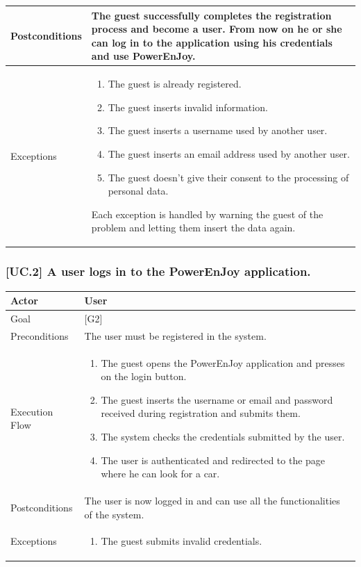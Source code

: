 \documentclass[english]{article}
\begin{document}
	\begin{tabularx}{\textwidth}{  l  X  }
		\hline
		Postconditions & The guest successfully completes the registration process and become a user. From now on he or she can log in to the application using his credentials and use PowerEnJoy.\\
		\hline
		Exceptions & \begin{enumerate}
			\item{The guest is already registered.}
			\item{The guest inserts invalid information.}
			\item{The guest inserts a username used by another user.}
			\item{The guest inserts an email address used by another user.}
			\item{The guest doesn't give their consent to the processing of personal data.}
		\end{enumerate}
		Each exception is handled by warning the guest of the problem and letting them insert the data again.\\
		\hline
	\end{tabularx}

	\subsubsection{[UC.2] A user logs in to the PowerEnJoy application.}
	\begin{tabularx}{\textwidth}{  l  X  }
		\hline
		Actor & User\\
		\hline
		Goal & [G2]\\
		\hline
		Preconditions & The user must be registered in the system.\\
		\hline
		Execution Flow & \begin{enumerate}
			\item{The guest opens the PowerEnJoy application and presses on the login button.}
			\item{The guest inserts the username or email and password received during registration and submits them.}
			\item{The system checks the credentials submitted by the user.}
			\item{The user is authenticated and redirected to the page where he can look for a car.}
		\end{enumerate}\\
		\hline
		Postconditions & The user is now  logged in and can use all the functionalities of the system.\\
		\hline
		Exceptions & \begin{enumerate}
			\item{The guest submits invalid credentials.}
		\end{enumerate}\\
		\hline
	\end{tabularx}
\end{document}
